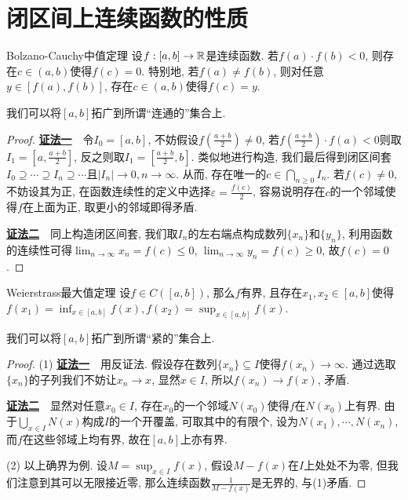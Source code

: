 \section{闭区间上连续函数的性质}

\begin{theorem}{Bolzano-Cauchy中值定理}
	设$f:[a,b] \to \mathbb{R}$是连续函数. 若$f(a) \cdot f(b) <0$, 则存在$c \in (a,b)$使得$f(c)=0$. 特别地, 若$f(a) \neq f(b)$, 则对任意$y \in [f(a),f(b)]$, 存在$c \in (a,b)$使得$f(c)=y$. 
\end{theorem}
\begin{remark}
	我们可以将$[a,b]$拓广到所谓“连通的”集合上. 
\end{remark}
\begin{proof}
	\underline{\textbf{证法一}}~~令$I_0=[a,b]$, 不妨假设$f(\frac{a+b}{2}) \neq 0$, 若$f(\frac{a+b}{2}) \cdot f(a)<0$则取$I_1=[a,\frac{a+b}{2}]$, 反之则取$I_1=[\frac{a+b}{2},b]$. 类似地进行构造, 我们最后得到闭区间套$I_0 \supseteq \cdots \supseteq I_n \supseteq \cdots$且$|I_n|\to 0,n \to \infty$. 从而, 存在唯一的$c \in \bigcap_{n\geq 0}I_n$. 若$f(c) \neq 0$, 不妨设其为正, 在函数连续性的定义中选择$\varepsilon = \frac{f(c)}{2}$, 容易说明存在$c$的一个邻域使得$f$在上面为正, 取更小的邻域即得矛盾. 
	
	\underline{\textbf{证法二}}~~同上构造闭区间套, 我们取$I_n$的左右端点构成数列$\{ x_n \}$和$\{ y_n \}$, 利用函数的连续性可得$\lim_{n\to \infty} x_n = f(c) \leq 0$, $\lim_{n\to \infty} y_n = f(c) \geq 0$, 故$f(c)=0$. 
\end{proof}

\begin{theorem}{Weierstrass最大值定理}
	设$f \in C([a,b])$, 那么$f$有界, 且存在$x_1,x_2 \in [a,b]$使得$f(x_1) = \inf_{x \in [a,b]} f(x), f(x_2) = \sup_{x \in [a,b]}f(x)$. 
\end{theorem}
\begin{remark}
	我们可以将$[a,b]$拓广到所谓“紧的”集合上. 
\end{remark}
\begin{proof}
	(1) \underline{\textbf{证法一}}~~用反证法. 假设存在数列$\{ x_n \} \subseteq I$使得$f(x_n) \to \infty$. 通过选取$\{ x_n \}$的子列我们不妨让$x_n \to x$, 显然$x \in I$, 所以$f(x_n) \to f(x)$, 矛盾. 
	
	\underline{\textbf{证法二}}~~显然对任意$x_0 \in I$, 存在$x_0$的一个邻域$N(x_0)$使得$f$在$N(x_0)$上有界. 由于$\bigcup_{x \in I} N(x)$构成$I$的一个开覆盖, 可取其中的有限个, 设为$N(x_1), \cdots ,N(x_n)$, 而$f$在这些邻域上均有界, 故在$[a,b]$上亦有界. 
	
	(2) 以上确界为例. 设$M=\sup_{x \in I}f(x)$, 假设$M-f(x)$在$I$上处处不为零, 但我们注意到其可以无限接近零, 那么连续函数$\frac{1}{M-f(x)}$是无界的, 与(1)矛盾. 
\end{proof}

